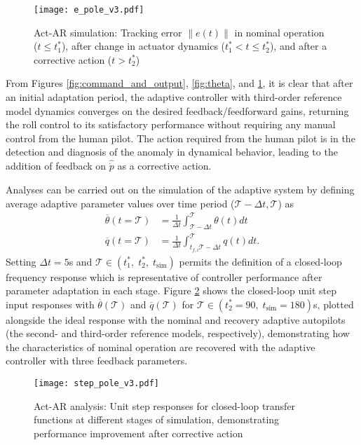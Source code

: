 \begin{figure}[h!]
	\centering
	\texttt{[image: e\_pole\_v3.pdf]}
	\caption{Act-AR simulation: Tracking error $\|e(t)\|$ in nominal operation ($t \leq t_1^*$), after change in actuator dynamics ($t_1^* < t \leq t_2^*$), and after a corrective action ($t > t_2^*$)}
	\label{fig:error}
\end{figure}

From Figures \ref{fig:command_and_output}, \ref{fig:theta}, and \ref{fig:error}, it is clear that after an initial adaptation period, the adaptive controller with third-order reference model dynamics converges on the desired feedback/feedforward gains, returning the roll control to its satisfactory performance without requiring any manual control from the human pilot. The action required from the human pilot is in the detection and diagnosis of the anomaly in dynamical behavior, leading to the addition of feedback on $\hat{\dot{p}}$ as a corrective action. 

Analyses can be carried out on the simulation of the adaptive system by defining average adaptive parameter values over time period ($\mathcal{T} - \Delta t, \mathcal{T}$) as
\begin{align}
	\overline{\theta}(t=\mathcal{T}) &= \frac{1}{\Delta t} \int_{\mathcal{T}-\Delta t}^{\mathcal{T}} \theta(t) dt \label{eqn:theta_bar}\\
	\overline{q} (t=\mathcal{T}) &= \frac{1}{\Delta t} \int_{t_{f,i}\mathcal{T}-\Delta t}^{\mathcal{T}} q(t) dt.\label{eqn:q_bar}
\end{align}
Setting $\Delta t = 5$s and $\mathcal{T} \in (t_1^*, \; t_2^*, \; t_{\textrm{sim}})$ permits the definition of a closed-loop frequency response which is representative of controller performance after parameter adaptation in each stage. Figure \ref{fig:step_pole} shows the closed-loop unit step input responses with $\overline{\theta}(\mathcal{T})$ and $\overline{q}(\mathcal{T})$ for $\mathcal{T} \in (t_2^* = 90, \; t_{\textrm{sim}} = 180)$s, plotted alongside the ideal response with the nominal and recovery adaptive autopilots (the second- and third-order reference models, respectively), demonstrating how the characteristics of nominal operation are recovered with the adaptive controller with three feedback parameters.

\begin{figure}[h!]
	\centering
	\texttt{[image: step\_pole\_v3.pdf]}
	\caption{Act-AR analysis: Unit step responses for closed-loop transfer functions at different stages of simulation, demonstrating performance improvement after corrective action}
	\label{fig:step_pole}
\end{figure}

